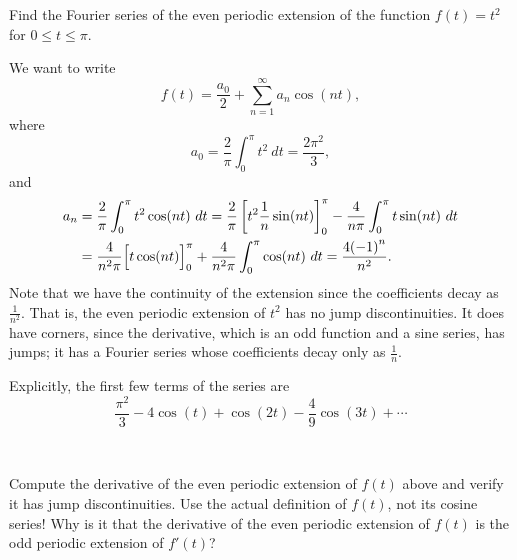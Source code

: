 
\begin{example}
Find the Fourier series of the even periodic extension of 
the function $f(t) = t^2$ for $0 \leq t \leq \pi$.

We want to write
\begin{equation*}
f(t) = \frac{a_0}{2} + \sum_{n=1}^\infty a_n \cos (n t) ,
\end{equation*}
where
\begin{equation*}
a_0 = \frac{2}{\pi}
\int_0^\pi t^2 ~ dt = \frac{2 \pi^2}{3} ,
\end{equation*}
and
\begin{equation*}
\begin{split}
a_n & = \frac{2}{\pi}
\int_0^\pi t^2 \cos (n t) ~ dt
= \frac{2}{\pi} \left[ t^2 \frac{1}{n} \sin (nt) \right]_0^\pi -
\frac{4}{n\pi}
\int_0^\pi t \sin (n t) ~ dt \\
& = 
\frac{4}{n^2\pi}
\Bigl[ t \cos (n t) \Bigr]_0^\pi
+
\frac{4}{n^2\pi}
\int_0^\pi \cos (n t) ~ dt
= 
\frac{4{(-1)}^n}{n^2} .
\end{split}
\end{equation*}
Note that we have  the continuity of the extension since the
coefficients decay as $\frac{1}{n^2}$.  That is, the even periodic extension
of $t^2$ has no jump discontinuities.  It does have corners, since
the derivative, which is an odd function and a sine series, has jumps; it has
a Fourier series whose coefficients decay only as $\frac{1}{n}$.

Explicitly, the first few terms of the series are
\begin{equation*}
\frac{\pi^2}{3} - 4 \cos (t) + \cos (2t) - \frac{4}{9} \cos (3t) + \cdots
\end{equation*}
\end{example}

\begin{exercise}
{\ }
\begin{tasks}
\task Compute the derivative of the even periodic extension of $f(t)$ above and verify it
has jump discontinuities.  Use the actual definition of $f(t)$, not its cosine
series!
\task Why is it that the derivative of the even periodic extension of $f(t)$ is the
odd periodic extension of $f'(t)$?
\end{tasks}
\end{exercise}

